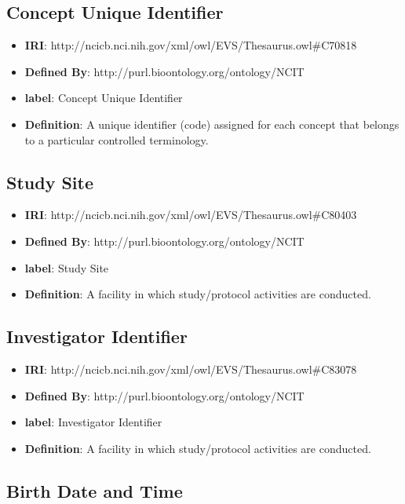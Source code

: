 \documentclass[a4paper,12pt,oneside]{article}
\begin{document}
  \subsection{Concept Unique Identifier}

  \begin{itemize}
     \item \textbf{IRI}: http://ncicb.nci.nih.gov/xml/owl/EVS/Thesaurus.owl\#C70818
     \item \textbf{Defined By}: http://purl.bioontology.org/ontology/NCIT
     \item \textbf{label}: Concept Unique Identifier
     \item \textbf{Definition}: A unique identifier (code) assigned for each concept that belongs to a particular controlled terminology.
  \end{itemize}


  \subsection{Study Site}

  \begin{itemize}
     \item \textbf{IRI}: http://ncicb.nci.nih.gov/xml/owl/EVS/Thesaurus.owl\#C80403
     \item \textbf{Defined By}: http://purl.bioontology.org/ontology/NCIT
     \item \textbf{label}: Study Site
     \item \textbf{Definition}: A facility in which study/protocol activities are conducted.
  \end{itemize}


  \subsection{Investigator Identifier}

  \begin{itemize}
     \item \textbf{IRI}: http://ncicb.nci.nih.gov/xml/owl/EVS/Thesaurus.owl\#C83078
     \item \textbf{Defined By}: http://purl.bioontology.org/ontology/NCIT
     \item \textbf{label}: Investigator Identifier
     \item \textbf{Definition}: A facility in which study/protocol activities are conducted.
  \end{itemize}


  \subsection{Birth Date and Time}
\end{document}
